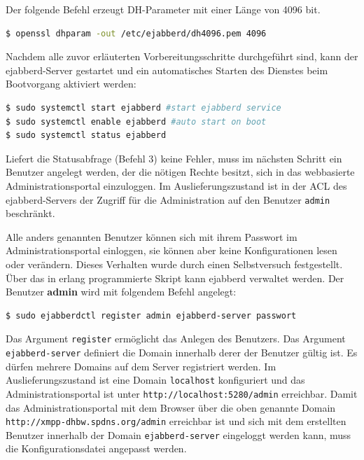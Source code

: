 \documentclass[a4paper,titlepage,halfparskip,12pt]{scrreprt}
\begin{document}
\begin{onehalfspacing}
Der folgende Befehl erzeugt DH-Parameter mit einer Länge von 4096 bit.

\bigskip

\begin{lstlisting}[language=bash, caption={Erzeugen von Diffie-Hellman-Parametern für den ejabberd-Server},label={lst:DHParameters}]
$ openssl dhparam -out /etc/ejabberd/dh4096.pem 4096
\end{lstlisting}

Nachdem alle zuvor erläuterten Vorbereitungsschritte durchgeführt sind, kann der ejabberd-Server gestartet und ein automatisches Starten des Dienstes beim Bootvorgang aktiviert werden:

\bigskip

\begin{lstlisting}[language=bash, caption={Starten der ejabberd-Instanz}]
$ sudo systemctl start ejabberd #start ejabberd service
$ sudo systemctl enable ejabberd #auto start on boot
$ sudo systemctl status ejabberd
\end{lstlisting}

Liefert die Statusabfrage (Befehl 3) keine Fehler, muss im nächsten Schritt ein Benutzer angelegt werden, der die nötigen Rechte besitzt, sich in das webbasierte Administrationsportal einzuloggen. Im Auslieferungszustand ist in der \ac{ACL} des ejabberd-Servers der Zugriff für die Administration auf den Benutzer \texttt{admin} beschränkt.\cite{ejabberdMGMT}

Alle anders genannten Benutzer können sich mit ihrem Passwort im Administrationsportal einloggen, sie können aber keine Konfigurationen lesen oder verändern. Dieses Verhalten wurde durch einen Selbstversuch festgestellt. Über das in erlang programmierte Skript kann ejabberd verwaltet werden. Der Benutzer \textbf{admin} wird mit folgendem Befehl angelegt:\cite{ejabberdMGMT}

\bigskip

\begin{lstlisting}[language=bash, caption={Anlegen eines Benutzers für die Verwaltung von ejabberd},label={lst:AddAdminUserEjabberd}]
$ sudo ejabberdctl register admin ejabberd-server passwort
\end{lstlisting}

Das Argument \texttt{register} ermöglicht das Anlegen des Benutzers. Das Argument \texttt{ejabberd-server} definiert die Domain innerhalb derer der Benutzer gültig ist. Es dürfen mehrere Domains auf dem Server registriert werden. Im Auslieferungszustand ist eine Domain \texttt{localhost} konfiguriert und das Administrationsportal ist unter \texttt{http://localhost:5280/admin} erreichbar. Damit das Administrationsportal mit dem Browser über die oben genannte Domain \texttt{http://xmpp-dhbw.spdns.org/admin} erreichbar ist und sich mit dem erstellten Benutzer innerhalb der Domain \texttt{ejabberd-server} eingeloggt werden kann, muss die Konfigurationsdatei angepasst werden.\cite{ejabberdMGMT}


\end{onehalfspacing}
\end{document}

